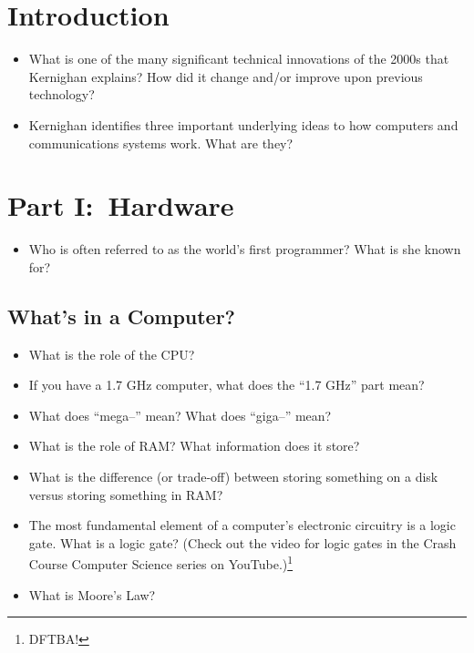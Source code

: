 \documentclass[12pt]{article}
\begin{document}
\section*{Introduction}
\begin{itemize}
	\item What is one of the many significant technical innovations of the 2000s that Kernighan explains? How did it change and/or improve upon previous technology?
	\item Kernighan identifies three important underlying ideas to how computers and communications systems work. What are they?
	
\end{itemize}

\hrulefill

\section*{Part I:\ Hardware}
\begin{itemize}
	\item Who is often referred to as the world's first programmer? What is she known for?
\end{itemize}

\subsection*{What's in a Computer?}
\begin{itemize}
	\item What is the role of the CPU?
	\item If you have a 1.7 GHz computer, what does the ``1.7 GHz'' part mean?
	\item What does ``mega--'' mean? What does ``giga--'' mean?
	\item What is the role of RAM? What information does it store?
	\item What is the difference (or trade-off) between storing something on a disk versus storing something in RAM?
	\item The most fundamental element of a computer's electronic circuitry is a logic gate. What is a logic gate? (Check out the video for logic gates in the Crash Course Computer Science series on YouTube.)\footnote{DFTBA!}
	\item What is Moore's Law?
\end{itemize}
\end{document}
